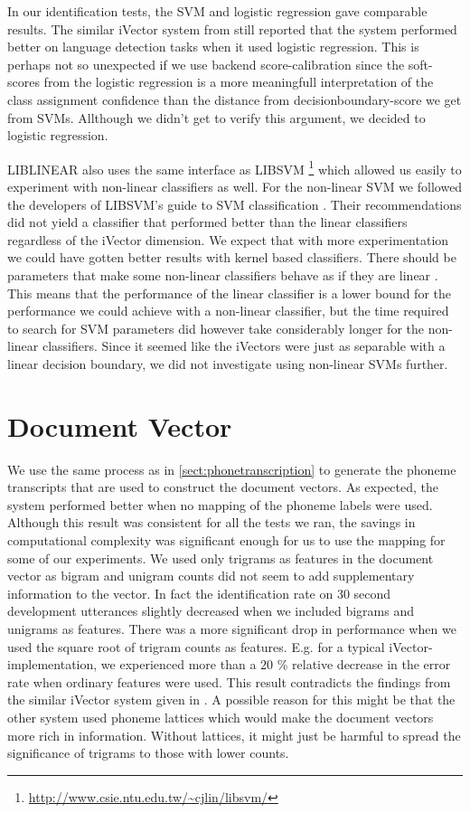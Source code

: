 In our identification tests, the SVM and logistic regression gave comparable results. The similar iVector system from \cite{lrivector} still reported that the system performed better on language detection tasks when it used logistic regression. This is perhaps not so unexpected if we use backend score-calibration since the soft-scores from the logistic regression is a more meaningfull interpretation of the class assignment confidence than the distance from decisionboundary-score we get from SVMs. Allthough we didn't get to verify this argument, we decided to logistic regression.

LIBLINEAR also uses the same interface as LIBSVM \footnote{\url{http://www.csie.ntu.edu.tw/~cjlin/libsvm/}} which allowed us easily to experiment with non-linear classifiers as well. For the non-linear SVM we followed the developers of LIBSVM's guide to SVM classification \cite{practicalsvm}. Their recommendations did not yield a classifier that performed better than the linear classifiers regardless of the iVector dimension. We expect that with more experimentation we could have gotten better results with kernel based classifiers. There should be parameters that make some non-linear classifiers behave as if they are linear \cite{keerthi2003asymptotic}. This means that the performance of the linear classifier is a lower bound for the performance we could achieve with a non-linear classifier, but the time required to search for SVM parameters did however take considerably longer for the non-linear classifiers. Since it seemed like the iVectors were just as separable with a linear decision boundary, we did not investigate using non-linear SVMs further. 

\section{Document Vector}
\label{sect:docvectlength}

We use the same process as in \ref{sect:phonetranscription} to generate the phoneme transcripts that are used to construct the document vectors. As expected, the system performed better when no mapping of the phoneme labels were used. Although this result was consistent for all the tests we ran, the savings in computational complexity was significant enough for us to use the mapping for some of our experiments. We used only trigrams as features in the document vector as bigram and unigram counts did not seem to add supplementary information to the vector. In fact the identification rate on 30 second development utterances slightly decreased when we included bigrams and unigrams as features. There was a more significant drop in performance when we used the square root of trigram counts as features. E.g. for a typical iVector-implementation, we experienced more than a $20$ \% relative decrease in the error rate when ordinary features were used. This result contradicts the findings from the similar iVector system given in \cite{lrivector}. A possible reason for this might be that the other system used phoneme lattices which would make the document vectors more rich in information. Without lattices, it might just be harmful to spread the significance of trigrams to those with lower counts.


